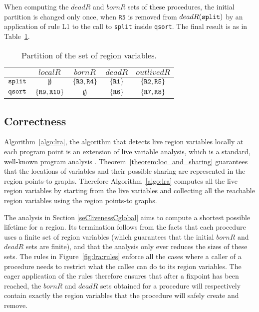 \documentclass{tlp}
\newcommand{\deadR}[1]{\ensuremath{{deadR}(#1)}}
\def\bornRegs{\mathit{bornR}}
\def\deadRegs{\mathit{deadR}}
\def\localRegs{\mathit{localR}}
\def\outlivedRegs{\mathit{outlivedR}}
\newcommand{\code}[1]{{\tt#1}}
\begin{document}
When computing the $\deadRegs$ and $\bornRegs$ sets of these procedures,
the initial partition is changed only once,
when \code{R5} is removed from $\deadR{\code{split}}$
by an application of rule L1 to the call to \code{split} inside \code{qsort}.
The final result is as in Table~\ref{table:lra:across}.
\begin{table}
    \centering
    \small
    \caption{Partition of the set of region variables.}
    \begin{tabular}{l|*{4}{c|}}
        \hline
        \hline
                          & $\localRegs$                  & $\bornRegs$               & $\deadRegs$     & $\outlivedRegs$     \\
        \hline
        $\code{split}$    & $\emptyset$                   & $\{\code{R3},\code{R4}\}$ & $\{\code{R1}\}$ & $\{\code{R2,R5}\}$  \\
        $\code{qsort}$    & $\{\code{R9},\code{R10}\} $   & $\emptyset$               & $\{\code{R6}\}$ & $\{\code{R7,R8}\}$  \\
        \hline
        \hline
    \end{tabular}
    \label{table:lra:across}
\end{table}

\subsection{Correctness}

Algorithm~\ref{algo:lra}, the algorithm that detects
live region variables locally at each program point
is an extension of live variable analysis,
which is a standard, well-known program analysis \cite{POPA}.
Theorem~\ref{theorem:loc_and_sharing} guarantees that
the locations of variables and their possible sharing
are represented in the region points-to graphs.
Therefore Algorithm~\ref{algo:lra} computes all the live region variables
by starting from the live variables
and collecting all the reachable region variables
using the region points-to graphs.

The analysis in Section \ref{seClivenessCglobal}
aims to compute a shortest possible lifetime for a region.
Its termination follows from the facts that
each procedure uses a finite set of region variables
(which guarantees that
the initial $\bornRegs$ and $\deadRegs$ sets are finite),
and that the analysis only ever reduces the sizes of these sets.
The rules in Figure~\ref{fig:lra:rules} enforce all the cases
where a caller of a procedure needs to restrict
what the callee can do to its region variables.
The eager application of the rules therefore ensures that
after a fixpoint has been reached,
the $\bornRegs$ and $\deadRegs$ sets obtained for a procedure
will respectively contain exactly the region variables
that the procedure will safely create and remove.
\end{document}
